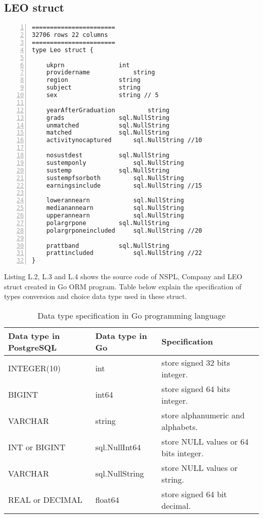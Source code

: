 \newpage

\subsection{LEO struct}

\lstset{basicstyle=\ttfamily\tiny}  
\begin{lstlisting}[breaklines, frame=single, numbers=left, caption={Source code for LEO struct. (leo.go)}, label=commandline-02]
=======================
32706 rows 22 columns 
=======================
type Leo struct {

	ukprn 				int
	providername 			string 
	region 				string 
	subject 			string 
	sex 				string // 5 
	
	yearAfterGraduation 		string 
	grads 				sql.NullString
	unmatched 			sql.NullString
	matched				sql.NullString
	activitynocaptured		sql.NullString //10
	
	nosustdest 			sql.NullString
	sustemponly 			sql.NullString
	sustemp 			sql.NullString
	sustempfsorboth			sql.NullString
	earningsinclude			sql.NullString //15 
	
	lowerannearn			sql.NullString
	medianannearn			sql.NullString
	upperannearn			sql.NullString
	polargrpone			sql.NullString
	polargrponeincluded		sql.NullString //20 
	
	prattband			sql.NullString
	prattincluded 			sql.NullString //22
}

\end{lstlisting}

Listing L.2, L.3 and L.4 shows the source code of NSPL, Company and LEO struct created in Go ORM program.  Table below explain the specification of types conversion and choice data type used in these struct. 

\begin{table}[H]
	\centering
	\begin{tabulary}{1.0\textwidth}{|L|L|L|}
		\hline
		{\textbf{Data type in PostgreSQL}} & {\bf Data type in Go} & {\bf Specification}  \\ \hline
		INTEGER(10)						  & int      			  & store signed 32 bits integer.                    \\ \hline
		BIGINT	&					int64     		& store signed 64 bits integer.                     \\ \hline
		VARCHAR & string       	& store alphanumeric and alphabets.                        \\ \hline
		INT or BIGINT & sql.NullInt64   & store NULL values or 64 bits integer.                                \\ \hline
		VARCHAR & sql.NullString  & store NULL values or string.                               \\ \hline
		REAL or DECIMAL & float64       	& store signed 64 bit decimal.                                  \\ \hline
	\end{tabulary}
	\caption{Data type specification in Go programming language}
\end{table}

